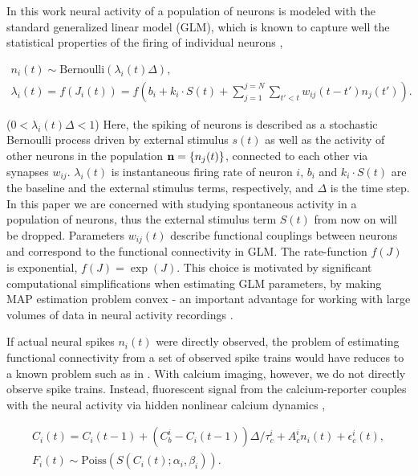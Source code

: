 In this work neural activity of a population of neurons is modeled with the standard generalized linear model (GLM), which is known to capture well the statistical properties of the firing of individual neurons \cite{PILL07, PAN03d, Wu07, Rigat06, OKA05}, 

\begin{equation}\label{eqn:glm:definition}
\begin{array}{l}
n_i(t)\sim \text{Bernoulli}(\lambda_i(t)\Delta), \\
\lambda_i(t)=f(J_i(t))=f(b_i+k_i\cdot S(t)+\sum\limits_{j=1}^{j=N} \sum\limits_{t'<t} w_{ij}(t-t')n_{j}(t')).
\end{array}
\end{equation}

($ 0 < \lambda_i(t)\Delta<1$)
Here, the spiking of neurons is described as a stochastic Bernoulli process driven by external stimulus $s(t)$ as well as the activity of other neurons in the population ${\bf n}=\{n_{j}(t)\}$, connected to each other via synapses $w_{ij}$.  $\lambda_i(t)$ is instantaneous firing rate of neuron $i$, $b_i$ and $k_i\cdot S(t)$ are the baseline and the external stimulus terms, respectively, and $\Delta$ is the time step.  In this paper we are concerned with studying spontaneous activity in a population of neurons, thus the external stimulus term $S(t)$ from now on will be dropped.  Parameters $w_{ij}(t)$ describe functional couplings between neurons and correspond to the functional connectivity in GLM.  The rate-function $f(J)$ is exponential, $f(J)=\exp(J)$.  This choice is motivated by significant computational simplifications when estimating GLM parameters, by making MAP estimation problem convex - an important advantage for working with large volumes of data
in neural activity recordings \cite{PAN03d}.

If actual neural spikes $n_i(t)$ were directly observed, the problem of estimating functional connectivity from a set of observed spike trains would have reduces to a known problem such as in \cite{PILL07}. With calcium imaging, however, we do not directly observe spike trains. Instead, fluorescent signal from the calcium-reporter couples with the neural activity via hidden nonlinear calcium dynamics \cite{Vogelstein2009}, 

\begin{equation}\label{eqn:ca:definition}
\begin{array}{l}
C_i(t) = C_i(t-1) + (C^i_b-C_i(t-1)) \Delta/\tau^i_c + A^i_c n_i(t)+\epsilon_c^i(t), \\
F_i(t) \sim \text{Poiss}( S(C_i(t);\alpha_i, \beta_i) ).
\end{array}
\end{equation}

